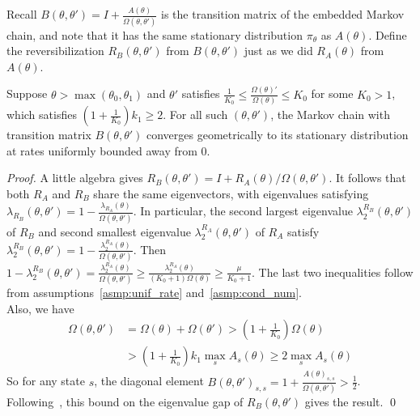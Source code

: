 Recall $B(\theta, \theta') = I+\frac{A(\theta)}{\Omega(\theta, \theta')}$
is the transition matrix of the embedded Markov chain, and note that 
it has the same stationary distribution $\pi_\theta$ as $A(\theta)$.
Define the reversibilization $R_B(\theta,\theta')$ from $B(\theta,\theta')$ 
just as we did $R_A(\theta)$ from $A(\theta)$. 
\begin{lemma}
  Suppose $\theta > \max (\theta_0, \theta_1)$ and $\theta'$ satisfies 
$\frac{1}{K_0} \le \frac{\Omega(\theta)'}{\Omega(\theta)} \le K_0 $ for some $K_0 > 1$, which satisfies $(1 + \frac{1}{K_0})k_1 \ge 2$. 
For all such $(\theta,\theta')$, the Markov chain with transition matrix $B(\theta,\theta')$ converges geometrically to its stationary 
distribution at rates uniformly bounded away from $0$.

  \label{lem:eig_lemma}
\end{lemma}
\begin{proof}
A little algebra gives $R_B(\theta,\theta') = I + R_A(\theta)/\Omega(\theta,\theta')$. It 
follows that both $R_A$ and $R_B$ share the same eigenvectors, with 
eigenvalues satisfying 
$\lambda_{R_B}(\theta, \theta') = 1 - \frac{\lambda_{R_A}(\theta)}{\Omega(\theta,
\theta')}$. In particular, the second largest eigenvalue 
$\lambda_2^{R_B}(\theta,\theta')$ of $R_B$ and  
second smallest eigenvalue $\lambda^{R_A}_2(\theta,\theta')$ of $R_A$ satisfy  
$\lambda^{R_B}_2(\theta,\theta') = 1 - \frac{\lambda^{R_A}_2(\theta)}{\Omega(\theta, \theta')}$.
Then $1 - \lambda^{R_B}_2(\theta,\theta') = \frac{\lambda^{R_A}_2(\theta)}{\Omega(\theta, \theta')} 
\ge \frac{\lambda^{R_A}_2(\theta)}{(K_0+1)\Omega(\theta)} 
\ge \frac{\mu}{K_0+1} $. The last two inequalities follow from 
assumptions~\ref{asmp:unif_rate} and~\ref{asmp:cond_num}. \\
Also, we have
\begin{align*}
\Omega(\theta, \theta') &= \Omega(\theta) + \Omega(\theta') > (1 + \frac{1}{K_0})\Omega(\theta)\\
& > (1 + \frac{1}{K_0})k_1\max_s A_{s}(\theta) \ge 2\max_s A_{s}(\theta) %
\end{align*}
So for any state $s$, the diagonal element $B(\theta, \theta')_{s,s} = 1 + \frac{A(\theta)_{s,s}}{\Omega(\theta, \theta')}> \frac{1}{2}$.
Following~\cite{fill1991}, this bound on the eigenvalue gap of $R_B(\theta,\theta')$ gives the result.
\qed
\end{proof}


